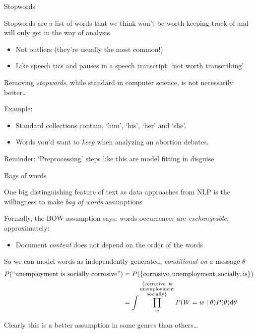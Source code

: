 \documentclass{hertieteaching}
\begin{document}
\begin{frame}{Stopwords}

Stopwords are a list of words that we think won't be worth keeping track of and will only get in the way of analysis
\begin{itemize}
  \item Not outliers (they're usually the most common!)
  \item Like speech tics and pauses in a speech transcript: `not worth transcribing'
\end{itemize}

\bigskip
Removing \textit{stopwords}, while standard in computer science, is not necessarily better\ldots

Example:
\begin{itemize}
\item Standard collections contain, `him', `his', `her' and `she'.
\item Words you'd want to \textit{keep} when analyzing an abortion debates.
\end{itemize}


Reminder: `Preprocessing' steps like this are model fitting in disguise
\end{frame}

\begin{frame}{Bags of words}

One big distinguishing feature of text as data approaches from NLP is the willingness to make \textit{bag of words} assumptions

Formally, the BOW assumption says: words occurrences are \textit{exchangeable}, approximately:
\begin{itemize}
  \item Document \textit{content} does not depend on the order of the words
\end{itemize}
So \parencite{deFinetti2008} we can model words as independently generated, \textit{conditional on} a message $\theta$
\begin{align*}
P(\text{``unemployment is socially corrosive''}) & = P(\{\text{corrosive}, \text{unemployment}, \text{socially}, \text{is}\})\\
 & = \int\- \prod^{\substack{\{\text{corrosive, is}\\
   \text{unemployment}\\\text{socially}\}}}_w \-\-P(W=w \mid \theta) P(\theta) \text{d}\theta
\end{align*}

Clearly this is a better assumption in some genres than others\ldots

\end{frame}
\end{document}
